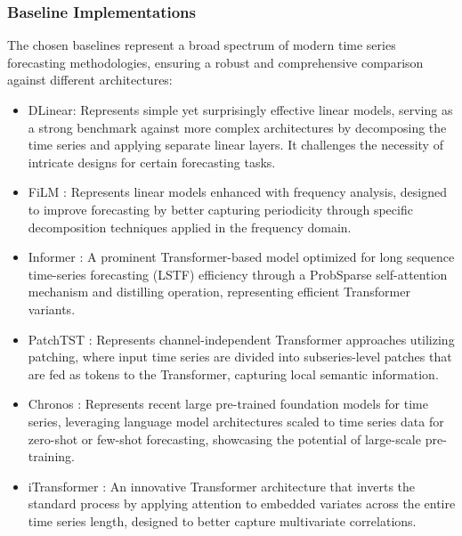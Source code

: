\documentclass{article}
\begin{document}
\subsubsection{Baseline Implementations}
The chosen baselines represent a broad spectrum of modern time series forecasting methodologies, ensuring a robust and comprehensive comparison against different architectures:

\begin{itemize}
    \item DLinear\cite{zeng_are_2022}: Represents simple yet surprisingly effective linear models, serving as a strong benchmark against more complex architectures by decomposing the time series and applying separate linear layers. It challenges the necessity of intricate designs for certain forecasting tasks.
    \item FiLM \cite{zhou2022film}: Represents linear models enhanced with frequency analysis, designed to improve forecasting by better capturing periodicity through specific decomposition techniques applied in the frequency domain.
    \item Informer \cite{zhou2021informer}: A prominent Transformer-based model optimized for long sequence time-series forecasting (LSTF) efficiency through a ProbSparse self-attention mechanism and distilling operation, representing efficient Transformer variants.
    \item PatchTST \cite{nie_time_2023}: Represents channel-independent Transformer approaches utilizing patching, where input time series are divided into subseries-level patches that are fed as tokens to the Transformer, capturing local semantic information.
    \item Chronos \cite{ansari_chronos_2024}: Represents recent large pre-trained foundation models for time series, leveraging language model architectures scaled to time series data for zero-shot or few-shot forecasting, showcasing the potential of large-scale pre-training.
    \item iTransformer \cite{liu_itransformer_2023}: An innovative Transformer architecture that inverts the standard process by applying attention to embedded variates across the entire time series length, designed to better capture multivariate correlations.
\end{itemize}
\end{document}
